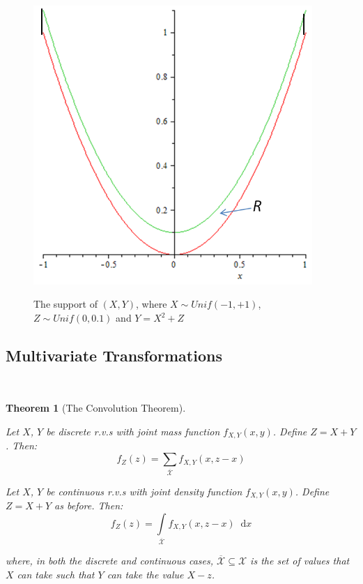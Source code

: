 \documentclass[12pt,a4paper]{article}
\newtheorem{thm}{Theorem}[subsection]
\newcommand{\diff}{\;\mathrm{d}}
\begin{document}
\begin{figure}[h]
\begin{center}
\includegraphics[height=10.58cm,width=10.58cm]{M2S1 Uncorrelated but Dependent.png}\label{figure uncorrelated, dependent}
\caption{The support of $(X,Y)$, where $X \sim Unif(-1,+1)$, $Z \sim Unif(0,0.1)$ and $Y = X^2 + Z$}
\end{center}
\end{figure}

\subsection{Multivariate Transformations}$\;$

\begin{thm}[The Convolution Theorem]$\quad$\par\vspace{1cm}

 Let $X$, $Y$ be discrete r.v.s with joint mass function $f_{X,Y}(x,y)$. Define $Z=X+Y$. Then:
$$f_Z(z) = \sum\limits_{\overline{\mathcal{X}}} f_{X,Y}(x,z-x)$$

 Let $X$, $Y$ be continuous r.v.s with joint density function $f_{X,Y}(x,y)$. Define $Z=X+Y$ as before. Then:
$$f_Z(z) = \int\limits_{\overline{\mathcal{X}}}\!\! f_{X,Y}(x,z-x)\;\diff x$$

\noindent where, in both the discrete and continuous cases, $\overline{\mathcal{X}}\subseteq\mathcal{X}$ is the set of values that $X$ can take such that $Y$ can take the value $X-z$.

\end{thm}
\end{document}
